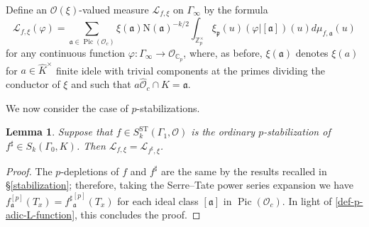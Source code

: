 \documentclass[a4paper,11pt]{amsart}
\numberwithin{equation}{section}
\theoremstyle{plain}
\newtheorem{lemma}[theorem]{Lemma}
\theoremstyle{definition}
\theoremstyle{remark}
\newcommand{\Z}{\mathbb{Z}}
\newcommand{\C}{\mathbb{C}}
\DeclareMathOperator{\Pic}{Pic}
\newcommand{\ST}{\mathrm{ST}}
\begin{document}
{Define an $\mathcal{O}(\xi)$-valued measure $\mathscr{L}_{f,\xi}$ on $\Gamma_\infty$ by 
the formula
	\begin{equation*} \label{L-f}
	\mathscr{L}_{f,\xi} (\varphi) = \sum_{\mathfrak{a} \in \Pic(\mathcal O_{c})} \xi(\mathfrak{a})\mathrm{N}(\mathfrak{a})^{-k/2}
	\int_{\Z_p^{\times}} \xi_{\mathfrak{p}}(u) (\varphi \big|[\mathfrak{a}])(u)d\mu_{f,\mathfrak{a}}(u)
	\end{equation*}
	for any continuous function $\varphi\colon\Gamma_\infty\rightarrow \mathcal{O}_{\C_p}$, where, as before,  
	$\xi(\mathfrak{a})$ denotes $\xi(a)$ for $a \in \widehat{K}^\times$ finite idele with trivial components at the primes dividing the conductor of $\xi$ and such that $a \widehat{\mathcal{O}}_c\cap K = \mathfrak{a}$. 

We now consider the case of $p$-stabilizations.

\begin{lemma}\label{lemma equality}\label{lemma5.1}Suppose that $f\in S_k^\ST(\Gamma_1,\mathcal{O})$ is the ordinary $p$-stabilization of $f^\sharp\in S_k(\Gamma_0,K)$. Then 
$\mathscr{L}_{f,\xi} = \mathscr{L}_{f^\sharp,\xi} $. 
\end{lemma}

\begin{proof} The $p$-depletions of $f$ and $f^\sharp$ are the same by the results recalled in \S\ref{stabilization}; therefore, taking the 
Serre--Tate power series expansion we have 
${f}^{[p]}_\mathfrak{a}(T_x)={f^\sharp}^{[p]}_\mathfrak{a}(T_x)$ for each ideal class 
$[\mathfrak{a}]$ in $\Pic(\mathcal{O}_c)$. 
In light of \eqref{def-p-adic-L-function}, this concludes the proof. 

\end{proof}}
\end{document}
